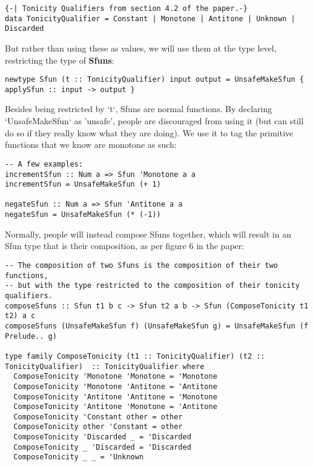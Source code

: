 \documentclass[11pt]{article}
\begin{document}
\begin{verbatim}
{-| Tonicity Qualifiers from section 4.2 of the paper.-}
data TonicityQualifier = Constant | Monotone | Antitone | Unknown | Discarded
\end{verbatim}

But rather than using these as values, we will use them at the type level, restricting the type of \textbf{Sfuns}:

\begin{verbatim}
newtype Sfun (t :: TonicityQualifier) input output = UnsafeMakeSfun { applySfun :: input -> output }
\end{verbatim}

Besides being restricted by `t`, Sfuns are normal functions.
By declaring `UnsafeMakeSfun` as 'unsafe', people are discouraged from using it (but can still do so if they really know what they are doing).
We use it to tag the primitive functions that we know are monotone as such:

\begin{verbatim}
-- A few examples:
incrementSfun :: Num a => Sfun 'Monotone a a
incrementSfun = UnsafeMakeSfun (+ 1)

negateSfun :: Num a => Sfun 'Antitone a a
negateSfun = UnsafeMakeSfun (* (-1))

\end{verbatim}

Normally, people will instead compose Sfuns together, which will result in an Sfun type that is their composition, as per figure 6 in the paper:

\begin{verbatim}
-- The composition of two Sfuns is the composition of their two functions,
-- but with the type restricted to the composition of their tonicity qualifiers.
composeSfuns :: Sfun t1 b c -> Sfun t2 a b -> Sfun (ComposeTonicity t1 t2) a c
composeSfuns (UnsafeMakeSfun f) (UnsafeMakeSfun g) = UnsafeMakeSfun (f Prelude.. g)

type family ComposeTonicity (t1 :: TonicityQualifier) (t2 :: TonicityQualifier)  :: TonicityQualifier where
  ComposeTonicity 'Monotone 'Monotone = 'Monotone
  ComposeTonicity 'Monotone 'Antitone = 'Antitone
  ComposeTonicity 'Antitone 'Antitone = 'Monotone
  ComposeTonicity 'Antitone 'Monotone = 'Antitone
  ComposeTonicity 'Constant other = other
  ComposeTonicity other 'Constant = other
  ComposeTonicity 'Discarded _ = 'Discarded
  ComposeTonicity _ 'Discarded = 'Discarded
  ComposeTonicity _ _ = 'Unknown

\end{verbatim}
\end{document}
